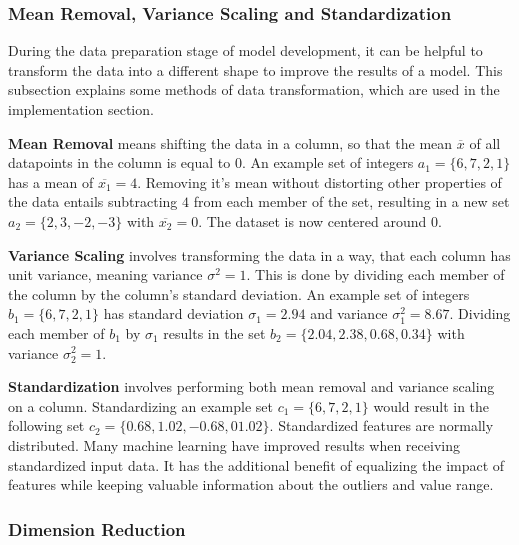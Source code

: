 \subsubsection{Mean Removal, Variance Scaling and Standardization}
\label{sec:Mean Removal, Variance Scaling and Standardization}
During the data preparation stage of model development, it can be helpful to transform the data into a different shape
to improve the results of a model.\cite[35]{Subasi2020} This subsection explains some methods of data transformation, which are used in the
implementation section.

\textbf{Mean Removal} means shifting the data in a column, so that the mean $\overline{x}$ of all datapoints in the
column is equal to $0$.\cite{ScikitPreprocessing}
An example set of integers $a_1 = \{6, 7, 2, 1\}$ has a mean of $\overline{x_1} = 4$.
Removing it's mean without distorting other properties of the data entails subtracting $4$ from each member of the
set, resulting in a new set $a_2 = \{2, 3, -2, -3\}$ with $\overline{x_2} = 0$. The dataset is now centered around $0$.

\textbf{Variance Scaling} involves transforming the data in a way, that each column has unit variance, meaning variance
$\sigma^2 = 1$.\cite{ScikitPreprocessing} This is done by dividing each member of the column by the column's standard deviation.
An example set of integers $b_1 = \{6, 7, 2, 1\}$ has standard deviation $\sigma_1 = 2.94$ and variance $\sigma_1^2 = 8.67$.
Dividing each member of $b_1$ by $\sigma_1$ results in the set $b_2 = \{2.04, 2.38, 0.68, 0.34\}$ with variance $\sigma_2^2 = 1$.

\textbf{Standardization} involves performing both mean removal and variance scaling on a column.\cite{ScikitPreprocessing}
Standardizing an example set $c_1 = \{6, 7, 2, 1\}$ would result in the following set $c_2 = \{0.68, 1.02, -0.68, 01.02\}$.
Standardized features are normally distributed. Many machine learning have improved results when receiving standardized input
data. It has the additional benefit of equalizing the impact of features while keeping valuable information about the outliers
and value range.\cite[35]{Subasi2020}

\subsubsection{Dimension Reduction}
\label{sec:Dimension Reduction}

